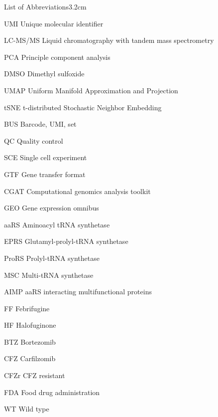 \begin{mclistof}{List of Abbreviations}{3.2cm}
\item[UMI] Unique molecular identifier

\item[LC-MS/MS] Liquid chromatography with tandem mass spectrometry

\item[PCA] Principle component analysis

\item[DMSO] Dimethyl sulfoxide

\item[UMAP] Uniform Manifold Approximation and Projection

\item[tSNE] t-distributed Stochastic Neighbor Embedding

\item[BUS] Barcode, UMI, set

\item[QC] Quality control

\item[SCE] Single cell experiment

\item[GTF] Gene transfer format

\item[CGAT] Computational genomics analysis toolkit

\item[GEO] Gene expression omnibus

\item[aaRS] Aminoacyl tRNA synthetase

\item[EPRS] Glutamyl-prolyl-tRNA synthetase

\item[ProRS] Prolyl-tRNA synthetase

\item[MSC] Multi-tRNA synthetase

\item[AIMP] aaRS interacting multifunctional proteins

\item[FF] Febrifugine

\item[HF] Halofuginone

\item[BTZ] Bortezomib

\item[CFZ] Carfilzomib

\item[CFZr] CFZ resistant

\item[FDA] Food drug administration

\item[WT] Wild type

\end{mclistof} 

